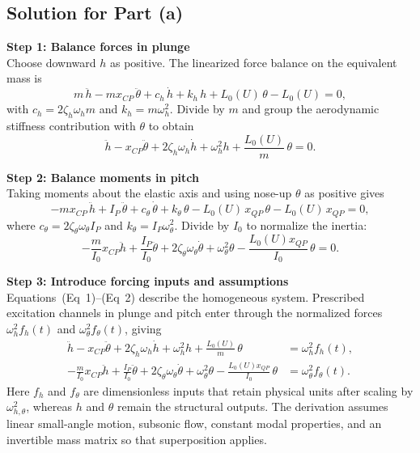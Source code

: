 \documentclass[12pt]{article}
\begin{document}
\subsection*{Solution for Part (a)}

\begin{stepbox}
\textbf{Step 1: Balance forces in plunge}\\[0.5em]
Choose downward $h$ as positive.  The linearized force balance on the equivalent mass is
\[
  m\,\ddot{h} - m x_{CP}\,\ddot{\theta}
  + c_h\,\dot{h} + k_h\,h
  + L_0(U)\,\theta - L_0(U) = 0,
\]
with $c_h = 2\zeta_h\omega_h m$ and $k_h = m\omega_h^2$.  Divide by $m$ and group the aerodynamic stiffness contribution with $\theta$ to obtain
\begin{equation}
  \ddot{h} - x_{CP}\ddot{\theta}
  + 2\zeta_h\omega_h\dot{h}
  + \omega_h^2 h
  + \frac{L_0(U)}{m}\,\theta = 0. \tag{Eq~1}
\end{equation}

\end{stepbox}

\begin{stepbox}
\textbf{Step 2: Balance moments in pitch}\\[0.5em]
Taking moments about the elastic axis and using nose-up $\theta$ as positive gives
\[
 -mx_{CP}\,\ddot{h} + I_P\,\ddot{\theta}
  + c_\theta\,\dot{\theta} + k_\theta\,\theta
  - L_0(U)\,x_{QP}\,\theta - L_0(U)\,x_{QP} = 0,
\]
where $c_\theta = 2\zeta_\theta\omega_\theta I_P$ and $k_\theta = I_P\omega_\theta^2$.  Divide by $I_0$ to normalize the inertia:
\begin{equation}
 -\frac{m}{I_0}x_{CP}\ddot{h}
 + \frac{I_P}{I_0}\ddot{\theta}
 + 2\zeta_\theta\omega_\theta \dot{\theta}
 + \omega_\theta^2 \theta
 - \frac{L_0(U)x_{QP}}{I_0}\,\theta = 0. \tag{Eq~2}
\end{equation}
\end{stepbox}

\begin{stepbox}
\textbf{Step 3: Introduce forcing inputs and assumptions}\\[0.5em]
Equations~(Eq~1)–(Eq~2) describe the homogeneous system.  Prescribed excitation channels in plunge and pitch enter through the normalized forces $\omega_h^2 f_h(t)$ and $\omega_\theta^2 f_\theta(t)$, giving
\begin{align}
 \ddot{h} - x_{CP}\ddot{\theta} + 2\zeta_h\omega_h \dot{h} + \omega_h^2 h + \frac{L_0(U)}{m}\,\theta &= \omega_h^2 f_h(t), \label{eq:plunge_forced}\\
 -\frac{m}{I_0}x_{CP}\ddot{h} + \frac{I_P}{I_0}\ddot{\theta} + 2\zeta_\theta \omega_\theta \dot{\theta} + \omega_\theta^2 \theta - \frac{L_0(U)x_{QP}}{I_0}\,\theta &= \omega_\theta^2 f_\theta(t). \label{eq:pitch_forced}
\end{align}
Here $f_h$ and $f_\theta$ are dimensionless inputs that retain physical units after scaling by $\omega_{h,\theta}^2$, whereas $h$ and $\theta$ remain the structural outputs.  The derivation assumes linear small-angle motion, subsonic flow, constant modal properties, and an invertible mass matrix so that superposition applies.
\end{stepbox}
\end{document}
